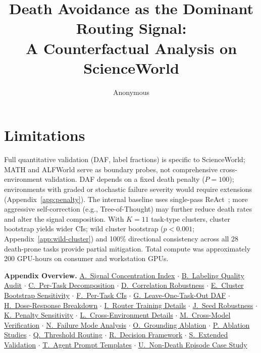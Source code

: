 \documentclass[11pt]{article}
\title{Death Avoidance as the Dominant Routing Signal:\\A Counterfactual Analysis on ScienceWorld}
\author{Anonymous}
\begin{document}
\maketitle









\section*{Limitations}
Full quantitative validation (DAF, label fractions) is specific to ScienceWorld; MATH and ALFWorld serve as boundary probes, not comprehensive cross-environment validation. DAF depends on a fixed death penalty ($P{=}100$); environments with graded or stochastic failure severity would require extensions (Appendix~\ref{app:penalty}). The internal baseline uses single-pass ReAct~\citep{react-2023}; more aggressive self-correction (e.g., Tree-of-Thought) may further reduce death rates and alter the signal composition. With $K{=}11$ task-type clusters, cluster bootstrap yields wider CIs; wild cluster bootstrap ($p < 0.001$; Appendix~\ref{app:wild-cluster}) and 100\% directional consistency across all 28 death-prone tasks provide partial mitigation. Total compute was approximately 200 GPU-hours on consumer and workstation GPUs.



\appendix

\noindent\textbf{Appendix Overview.}
\hyperref[app:sci]{A.~Signal Concentration Index} $\cdot$
\hyperref[app:labeling]{B.~Labeling Quality Audit} $\cdot$
\hyperref[app:per-task]{C.~Per-Task Decomposition} $\cdot$
\hyperref[app:correlation]{D.~Correlation Robustness} $\cdot$
\hyperref[app:wild-cluster]{E.~Cluster Bootstrap Sensitivity} $\cdot$
\hyperref[app:per-task-ci]{F.~Per-Task CIs} $\cdot$
\hyperref[app:loto-daf]{G.~Leave-One-Task-Out DAF} $\cdot$
\hyperref[app:dose-response]{H.~Dose-Response Breakdown} $\cdot$
\hyperref[app:router-details]{I.~Router Training Details} $\cdot$
\hyperref[app:seed-robustness]{J.~Seed Robustness} $\cdot$
\hyperref[app:penalty]{K.~Penalty Sensitivity} $\cdot$
\hyperref[app:cross-env-details]{L.~Cross-Environment Details} $\cdot$
\hyperref[app:cross-model]{M.~Cross-Model Verification} $\cdot$
\hyperref[app:failure-modes]{N.~Failure Mode Analysis} $\cdot$
\hyperref[app:grounding-ablation]{O.~Grounding Ablation} $\cdot$
\hyperref[app:ablations]{P.~Ablation Studies} $\cdot$
\hyperref[sec:threshold-routing]{Q.~Threshold Routing} $\cdot$
\hyperref[app:decision-framework]{R.~Decision Framework} $\cdot$
\hyperref[app:extended-validation]{S.~Extended Validation} $\cdot$
\hyperref[app:prompt-templates]{T.~Agent Prompt Templates} $\cdot$
\hyperref[app:non-death-case-study]{U.~Non-Death Episode Case Study}
\end{document}
